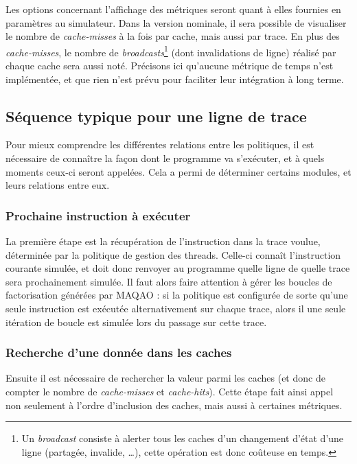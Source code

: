 Les options concernant l'affichage des métriques seront quant à elles fournies en paramètres au simulateur. Dans la version nominale, il sera possible de visualiser le nombre de \emph{cache-misses} à la fois par cache, mais aussi par trace. En plus des \emph{cache-misses}, le nombre de \emph{broadcasts}\footnote{Un \emph{broadcast} consiste à alerter tous les caches d'un changement d'état d'une ligne (partagée, invalide, \ldots), cette opération est donc coûteuse en temps.} (dont invalidations de ligne) réalisé par chaque cache sera aussi noté. Précisons ici qu'aucune métrique de temps n'est implémentée, et que rien n'est prévu pour faciliter leur intégration à long terme.

\subsection{Séquence typique pour une ligne de trace}

Pour mieux comprendre les différentes relations entre les politiques, il est nécessaire de connaître la façon dont le programme va s'exécuter, et à quels moments ceux-ci seront appelées. Cela a permi de déterminer certains modules, et leurs relations entre eux. 

\subsubsection{Prochaine instruction à exécuter}

La première étape est la récupération de l'instruction dans la trace voulue, déterminée par la politique de gestion des threads. Celle-ci connaît l'instruction courante simulée, et doit donc renvoyer au programme quelle ligne de quelle trace sera prochainement simulée. Il faut alors faire attention à gérer les boucles de factorisation générées par \textsc{MAQAO} : si la politique est configurée de sorte qu'une seule instruction est exécutée alternativement sur chaque trace, alors il une seule itération de boucle est simulée lors du passage sur cette trace. 

\subsubsection{Recherche d'une donnée dans les caches}

Ensuite il est nécessaire de rechercher la valeur parmi les caches (et donc de compter le nombre de \emph{cache-misses} et \emph{cache-hits}). Cette étape fait ainsi appel non seulement à l'ordre d'inclusion des caches, mais aussi à certaines métriques.

